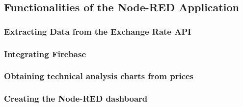 \subsection{Functionalities of the Node-RED Application}

\subsubsection{Extracting Data from the Exchange Rate API}
\subsubsection{Integrating Firebase}
\subsubsection{Obtaining technical analysis charts from prices}
\subsubsection{Creating the Node-RED dashboard}